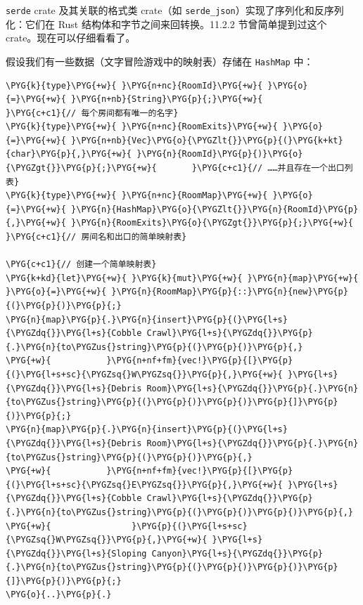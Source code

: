 \texttt{serde} crate 及其关联的格式类 crate（如 \texttt{serde\_json}）实现了序列化和反序列化：它们在 Rust 结构体和字节之间来回转换。11.2.2 节曾简单提到过这个 crate。现在可以仔细看看了。

假设我们有一些数据（文字冒险游戏中的映射表）存储在 \texttt{HashMap} 中：

\begin{Verbatim}[commandchars=\\\{\},breaklines=true,breakanywhere=true,fontsize=\codefont,xleftmargin=17bp]
\PYG{k}{type}\PYG{+w}{ }\PYG{n+nc}{RoomId}\PYG{+w}{ }\PYG{o}{=}\PYG{+w}{ }\PYG{n+nb}{String}\PYG{p}{;}\PYG{+w}{                       }\PYG{c+c1}{// 每个房间都有唯一的名字}
\PYG{k}{type}\PYG{+w}{ }\PYG{n+nc}{RoomExits}\PYG{+w}{ }\PYG{o}{=}\PYG{+w}{ }\PYG{n+nb}{Vec}\PYG{o}{\PYGZlt{}}\PYG{p}{(}\PYG{k+kt}{char}\PYG{p}{,}\PYG{+w}{ }\PYG{n}{RoomId}\PYG{p}{)}\PYG{o}{\PYGZgt{}}\PYG{p}{;}\PYG{+w}{       }\PYG{c+c1}{// ……并且存在一个出口列表}
\PYG{k}{type}\PYG{+w}{ }\PYG{n+nc}{RoomMap}\PYG{+w}{ }\PYG{o}{=}\PYG{+w}{ }\PYG{n}{HashMap}\PYG{o}{\PYGZlt{}}\PYG{n}{RoomId}\PYG{p}{,}\PYG{+w}{ }\PYG{n}{RoomExits}\PYG{o}{\PYGZgt{}}\PYG{p}{;}\PYG{+w}{  }\PYG{c+c1}{// 房间名和出口的简单映射表}

\PYG{c+c1}{// 创建一个简单映射表}
\PYG{k+kd}{let}\PYG{+w}{ }\PYG{k}{mut}\PYG{+w}{ }\PYG{n}{map}\PYG{+w}{ }\PYG{o}{=}\PYG{+w}{ }\PYG{n}{RoomMap}\PYG{p}{::}\PYG{n}{new}\PYG{p}{(}\PYG{p}{)}\PYG{p}{;}
\PYG{n}{map}\PYG{p}{.}\PYG{n}{insert}\PYG{p}{(}\PYG{l+s}{\PYGZdq{}}\PYG{l+s}{Cobble Crawl}\PYG{l+s}{\PYGZdq{}}\PYG{p}{.}\PYG{n}{to\PYGZus{}string}\PYG{p}{(}\PYG{p}{)}\PYG{p}{,}
\PYG{+w}{           }\PYG{n+nf+fm}{vec!}\PYG{p}{[}\PYG{p}{(}\PYG{l+s+sc}{\PYGZsq{}W\PYGZsq{}}\PYG{p}{,}\PYG{+w}{ }\PYG{l+s}{\PYGZdq{}}\PYG{l+s}{Debris Room}\PYG{l+s}{\PYGZdq{}}\PYG{p}{.}\PYG{n}{to\PYGZus{}string}\PYG{p}{(}\PYG{p}{)}\PYG{p}{)}\PYG{p}{]}\PYG{p}{)}\PYG{p}{;}
\PYG{n}{map}\PYG{p}{.}\PYG{n}{insert}\PYG{p}{(}\PYG{l+s}{\PYGZdq{}}\PYG{l+s}{Debris Room}\PYG{l+s}{\PYGZdq{}}\PYG{p}{.}\PYG{n}{to\PYGZus{}string}\PYG{p}{(}\PYG{p}{)}\PYG{p}{,}
\PYG{+w}{           }\PYG{n+nf+fm}{vec!}\PYG{p}{[}\PYG{p}{(}\PYG{l+s+sc}{\PYGZsq{}E\PYGZsq{}}\PYG{p}{,}\PYG{+w}{ }\PYG{l+s}{\PYGZdq{}}\PYG{l+s}{Cobble Crawl}\PYG{l+s}{\PYGZdq{}}\PYG{p}{.}\PYG{n}{to\PYGZus{}string}\PYG{p}{(}\PYG{p}{)}\PYG{p}{)}\PYG{p}{,}
\PYG{+w}{                }\PYG{p}{(}\PYG{l+s+sc}{\PYGZsq{}W\PYGZsq{}}\PYG{p}{,}\PYG{+w}{ }\PYG{l+s}{\PYGZdq{}}\PYG{l+s}{Sloping Canyon}\PYG{l+s}{\PYGZdq{}}\PYG{p}{.}\PYG{n}{to\PYGZus{}string}\PYG{p}{(}\PYG{p}{)}\PYG{p}{)}\PYG{p}{]}\PYG{p}{)}\PYG{p}{;}
\PYG{o}{..}\PYG{p}{.}
\end{Verbatim}

